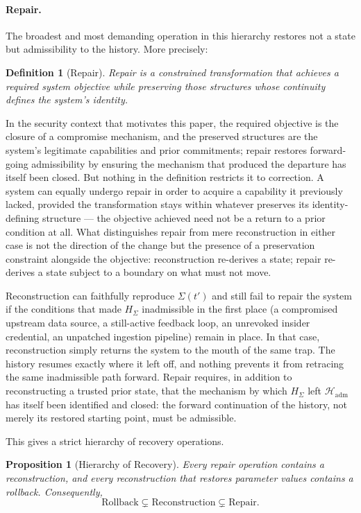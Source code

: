 \documentclass[11pt]{article}
\newtheorem{definition}{Definition}
\newtheorem{proposition}{Proposition}
\begin{document}
\paragraph{Repair.} The broadest and most demanding operation in this hierarchy restores not a state but admissibility to the history. More precisely:

\begin{definition}[Repair]
Repair is a constrained transformation that achieves a required system objective while preserving those structures whose continuity defines the system's identity.
\end{definition}

In the security context that motivates this paper, the required objective is the closure of a compromise mechanism, and the preserved structures are the system's legitimate capabilities and prior commitments; repair restores forward-going admissibility by ensuring the mechanism that produced the departure has itself been closed. But nothing in the definition restricts it to correction. A system can equally undergo repair in order to acquire a capability it previously lacked, provided the transformation stays within whatever preserves its identity-defining structure --- the objective achieved need not be a return to a prior condition at all. What distinguishes repair from mere reconstruction in either case is not the direction of the change but the presence of a preservation constraint alongside the objective: reconstruction re-derives a state; repair re-derives a state subject to a boundary on what must not move.

Reconstruction can faithfully reproduce $\Sigma(t')$ and still fail to repair the system if the conditions that made $H_\Sigma$ inadmissible in the first place (a compromised upstream data source, a still-active feedback loop, an unrevoked insider credential, an unpatched ingestion pipeline) remain in place. In that case, reconstruction simply returns the system to the mouth of the same trap. The history resumes exactly where it left off, and nothing prevents it from retracing the same inadmissible path forward. Repair requires, in addition to reconstructing a trusted prior state, that the mechanism by which $H_\Sigma$ left $\mathcal{H}_{\mathrm{adm}}$ has itself been identified and closed: the forward continuation of the history, not merely its restored starting point, must be admissible.

This gives a strict hierarchy of recovery operations.

\begin{proposition}[Hierarchy of Recovery]
Every repair operation contains a reconstruction, and every reconstruction that restores parameter values contains a rollback. Consequently,
\begin{equation}
\text{Rollback} \subsetneq \text{Reconstruction} \subsetneq \text{Repair}.
\end{equation}
\end{proposition}
\end{document}
